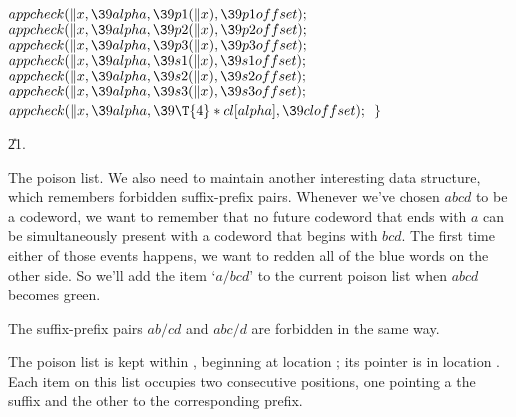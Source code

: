 ${}\\{appcheck}(\|x,\39\\{alpha},\39\\{p1}(\|x),\39\\{p1offset});{}$\6
${}\\{appcheck}(\|x,\39\\{alpha},\39\\{p2}(\|x),\39\\{p2offset});{}$\6
${}\\{appcheck}(\|x,\39\\{alpha},\39\\{p3}(\|x),\39\\{p3offset});{}$\6
${}\\{appcheck}(\|x,\39\\{alpha},\39\\{s1}(\|x),\39\\{s1offset});{}$\6
${}\\{appcheck}(\|x,\39\\{alpha},\39\\{s2}(\|x),\39\\{s2offset});{}$\6
${}\\{appcheck}(\|x,\39\\{alpha},\39\\{s3}(\|x),\39\\{s3offset});{}$\6
${}\\{appcheck}(\|x,\39\\{alpha},\39\T{4}*\\{cl}[\\{alpha}],\39%
\\{cloffset});{}$\6
\4${}\}{}$\2\2\par
\U21.\fi

The poison list. We also need to maintain another interesting data
structure, which remembers forbidden suffix-prefix pairs. Whenever
we've chosen $abcd$ to be a codeword, we want to remember that
no future codeword that ends with $a$ can be simultaneously present
with a codeword that begins with $bcd$. The first time either of those
events happens, we want to redden all of the blue words on the other side.
So we'll add the item `$a/bcd$' to the current poison list when $abcd$ becomes
green.

The suffix-prefix pairs $ab/cd$ and $abc/d$ are forbidden in the same way.

The poison list is kept within , beginning at location ;
its pointer is in  location . Each item on
this list occupies
two consecutive  positions, one pointing a the suffix and the other
to the corresponding prefix.

